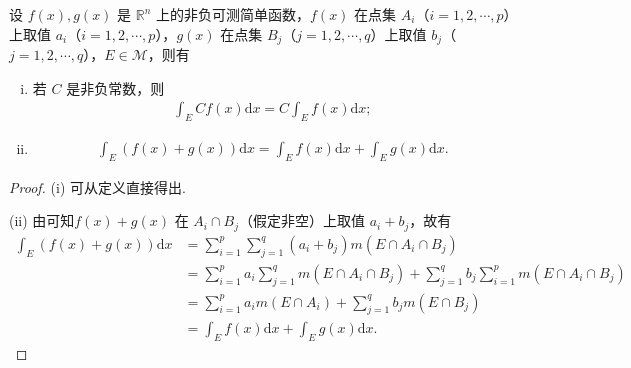 \documentclass[../../main.tex]{subfiles}%
\begin{document}
\begin{theorem}[积分的线性性质]\label{theorem:简单函数积分的线性性质}
设 \(f(x),g(x)\) 是 \(\mathbb{R}^n\) 上的非负可测简单函数，\(f(x)\) 在点集 \(A_i\)（\(i = 1,2,\cdots,p\)）上取值 \(a_i\)（\(i = 1,2,\cdots,p\)），\(g(x)\) 在点集 \(B_j\)（\(j = 1,2,\cdots,q\)）上取值 \(b_j\)（\(j = 1,2,\cdots,q\)），\(E\in\mathscr{M}\)，则有
\begin{enumerate}[(i)]
\item 若 \(C\) 是非负常数，则
\begin{align*}
\int_{E}Cf(x)\mathrm{d}x = C\int_{E}f(x)\mathrm{d}x;
\end{align*}
\item 
\begin{align*}
\int_{E}(f(x)+g(x))\mathrm{d}x=\int_{E}f(x)\mathrm{d}x+\int_{E}g(x)\mathrm{d}x.
\end{align*}
\end{enumerate}
\end{theorem}
\begin{proof}
(i) 可从定义直接得出.

(ii) 由可知\(f(x)+g(x)\) 在 \(A_i\cap B_j\)（假定非空）上取值 \(a_i + b_j\)，故有
\begin{align*}
\int_{E}(f(x)+g(x))\mathrm{d}x&=\sum_{i = 1}^{p}\sum_{j = 1}^{q}(a_i + b_j)m(E\cap A_i\cap B_j)\\
&=\sum_{i = 1}^{p}a_i\sum_{j = 1}^{q}m(E\cap A_i\cap B_j)+\sum_{j = 1}^{q}b_j\sum_{i = 1}^{p}m(E\cap A_i\cap B_j)\\
&=\sum_{i = 1}^{p}a_im(E\cap A_i)+\sum_{j = 1}^{q}b_jm(E\cap B_j)\\
&=\int_{E}f(x)\mathrm{d}x+\int_{E}g(x)\mathrm{d}x.
\end{align*} 
\end{proof}
\end{document}
